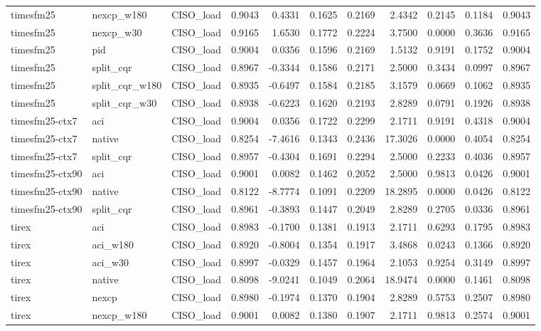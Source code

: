 \begin{tabular}{lllrrrrrrrr}
timesfm25 & nexcp_w180 & CISO_load & 0.9043 & 0.4331 & 0.1625 & 0.2169 & 2.4342 & 0.2145 & 0.1184 & 0.9043 \\
timesfm25 & nexcp_w30 & CISO_load & 0.9165 & 1.6530 & 0.1772 & 0.2224 & 3.7500 & 0.0000 & 0.3636 & 0.9165 \\
timesfm25 & pid & CISO_load & 0.9004 & 0.0356 & 0.1596 & 0.2169 & 1.5132 & 0.9191 & 0.1752 & 0.9004 \\
timesfm25 & split_cqr & CISO_load & 0.8967 & -0.3344 & 0.1586 & 0.2171 & 2.5000 & 0.3434 & 0.0997 & 0.8967 \\
timesfm25 & split_cqr_w180 & CISO_load & 0.8935 & -0.6497 & 0.1584 & 0.2185 & 3.1579 & 0.0669 & 0.1062 & 0.8935 \\
timesfm25 & split_cqr_w30 & CISO_load & 0.8938 & -0.6223 & 0.1620 & 0.2193 & 2.8289 & 0.0791 & 0.1926 & 0.8938 \\
timesfm25-ctx7 & aci & CISO_load & 0.9004 & 0.0356 & 0.1722 & 0.2299 & 2.1711 & 0.9191 & 0.4318 & 0.9004 \\
timesfm25-ctx7 & native & CISO_load & 0.8254 & -7.4616 & 0.1343 & 0.2436 & 17.3026 & 0.0000 & 0.4054 & 0.8254 \\
timesfm25-ctx7 & split_cqr & CISO_load & 0.8957 & -0.4304 & 0.1691 & 0.2294 & 2.5000 & 0.2233 & 0.4036 & 0.8957 \\
timesfm25-ctx90 & aci & CISO_load & 0.9001 & 0.0082 & 0.1462 & 0.2052 & 2.5000 & 0.9813 & 0.0426 & 0.9001 \\
timesfm25-ctx90 & native & CISO_load & 0.8122 & -8.7774 & 0.1091 & 0.2209 & 18.2895 & 0.0000 & 0.0426 & 0.8122 \\
timesfm25-ctx90 & split_cqr & CISO_load & 0.8961 & -0.3893 & 0.1447 & 0.2049 & 2.8289 & 0.2705 & 0.0336 & 0.8961 \\
tirex & aci & CISO_load & 0.8983 & -0.1700 & 0.1381 & 0.1913 & 2.1711 & 0.6293 & 0.1795 & 0.8983 \\
tirex & aci_w180 & CISO_load & 0.8920 & -0.8004 & 0.1354 & 0.1917 & 3.4868 & 0.0243 & 0.1366 & 0.8920 \\
tirex & aci_w30 & CISO_load & 0.8997 & -0.0329 & 0.1457 & 0.1964 & 2.1053 & 0.9254 & 0.3149 & 0.8997 \\
tirex & native & CISO_load & 0.8098 & -9.0241 & 0.1049 & 0.2064 & 18.9474 & 0.0000 & 0.1461 & 0.8098 \\
tirex & nexcp & CISO_load & 0.8980 & -0.1974 & 0.1370 & 0.1904 & 2.8289 & 0.5753 & 0.2507 & 0.8980 \\
tirex & nexcp_w180 & CISO_load & 0.9001 & 0.0082 & 0.1380 & 0.1907 & 2.1711 & 0.9813 & 0.2574 & 0.9001 \\

\end{tabular}
